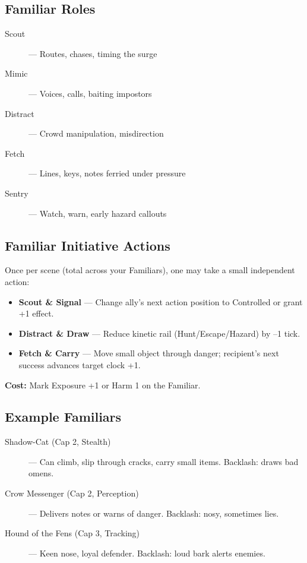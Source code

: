 \subsection*{Familiar Roles}

\begin{description}
  \item[Scout] — Routes, chases, timing the surge
  \item[Mimic] — Voices, calls, baiting impostors
  \item[Distract] — Crowd manipulation, misdirection
  \item[Fetch] — Lines, keys, notes ferried under pressure
  \item[Sentry] — Watch, warn, early hazard callouts
\end{description}

\subsection*{Familiar Initiative Actions}

Once per scene (total across your Familiars), one may take a small independent action:

\begin{itemize}
  \item \textbf{Scout \& Signal} — Change ally's next action position to Controlled or grant +1 effect.
  \item \textbf{Distract \& Draw} — Reduce kinetic rail (Hunt/Escape/Hazard) by –1 tick.
  \item \textbf{Fetch \& Carry} — Move small object through danger; recipient's next success advances target clock +1.
\end{itemize}

\textbf{Cost:} Mark Exposure +1 or Harm 1 on the Familiar.

\subsection*{Example Familiars}

\begin{description}
  \item[Shadow-Cat (Cap 2, Stealth)] — Can climb, slip through cracks, carry small items. Backlash: draws bad omens.
  \item[Crow Messenger (Cap 2, Perception)] — Delivers notes or warns of danger. Backlash: nosy, sometimes lies.
  \item[Hound of the Fens (Cap 3, Tracking)] — Keen nose, loyal defender. Backlash: loud bark alerts enemies.
\end{description}

